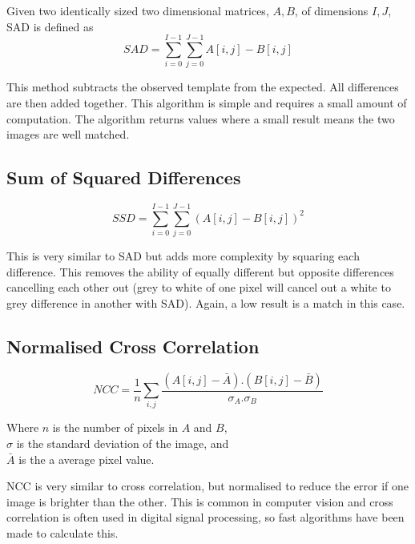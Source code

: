 Given two identically sized two dimensional matrices, $A, B$, of dimensions $I,J$, SAD is defined as
\begin{equation} \label{eq:SAD}
SAD = \sum\limits_{i=0}^{I-1} \sum\limits_{j=0}^{J-1} A[i,j] - B[i,j] 
\end{equation}

This method subtracts the observed template from the expected. All differences are then added together. This algorithm is simple and requires a small amount of computation. The algorithm returns values where a small result means the two images are well matched.

\subsection{Sum of Squared Differences}\label{Section:SSD}
\begin{equation}\label{eq:SSD}
SSD = \sum\limits_{i=0}^{I-1} \sum\limits_{j=0}^{J-1} (A[i,j] - B[i,j] )^2
\end{equation}

This is very similar to SAD but adds more complexity by squaring each difference. This removes the ability of equally different but opposite differences cancelling each other out (grey to white of one pixel will cancel out a white to grey difference in another with SAD). Again, a low result is a match in this case.

%


\subsection{Normalised Cross Correlation}\label{Section:NCC}
\begin{equation}\label{eq:NCC}
NCC =  \frac{1}{n}\sum\limits_{i,j} \frac{(A[i,j] - \bar{A}).(B[i,j] - \bar{B})}{\sigma _A . \sigma _B}
\end{equation}
\begin{center}
Where $n$ is the number of pixels in $A$ and $B$, \\$\sigma$ is the standard deviation of the image, and \\$\bar{A}$ is the a average pixel value. 
\end{center}
NCC is very similar to cross correlation, but normalised to reduce the error if one image is brighter than the other. This is common in computer vision \citep{Tsai:NCC} and cross correlation is often used in digital signal processing, so fast algorithms have been made to calculate this. 

